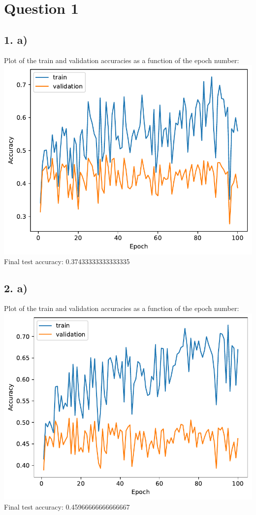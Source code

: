 \documentclass[12pt,a4paper]{article}
\begin{document}
    \setcounter{page}{2}
    \setcounter{secnumdepth}{0} %
    \setlength{\parskip}{0em}

    \newlength{\imagewidth} %
    \setlength{\imagewidth}{8cm} %


    \section{Question 1}
    \subsection{1. a)}
        Plot of the train and validation accuracies as a function of the epoch number: \\
        \includegraphics[width=\imagewidth]{q1/q1_1a-accs.pdf} \\
        Final test accuracy: 0.37433333333333335

    \subsection{2. a)}
        Plot of the train and validation accuracies as a function of the epoch number: \\
        \includegraphics[width=\imagewidth]{q1/q1_2a-accs.pdf} \\
        Final test accuracy: 0.45966666666666667
    
\end{document}
